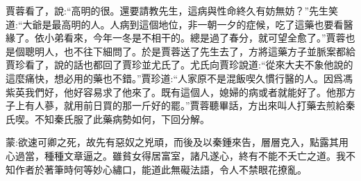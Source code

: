 \begin{parag}
    賈蓉看了，說:“高明的很。還要請教先生，這病與性命終久有妨無妨？”先生笑道:“大爺是最高明的人。人病到這個地位，非一朝一夕的症候，吃了這藥也要看醫緣了。依小弟看來，今年一冬是不相干的。總是過了春分，就可望全愈了。”賈蓉也是個聰明人，也不往下細問了。於是賈蓉送了先生去了，方將這藥方子並脈案都給賈珍看了，說的話也都回了賈珍並尤氏了。尤氏向賈珍說道:“從來大夫不象他說的這麼痛快，想必用的藥也不錯。”賈珍道:“人家原不是混飯喫久慣行醫的人。因爲馮紫英我們好，他好容易求了他來了。既有這個人，媳婦的病或者就能好了。他那方子上有人蔘，就用前日買的那一斤好的罷。”賈蓉聽畢話，方出來叫人打藥去煎給秦氏喫。不知秦氏服了此藥病勢如何，下回分解。
\end{parag}


\begin{parag}
    \begin{note}蒙:欲速可卿之死，故先有惡奴之兇頑，而後及以秦鍾來告，層層克入，點露其用心過當，種種文章逼之。雖貧女得居富室，諸凡遂心，終有不能不夭亡之道。我不知作者於著筆時何等妙心繡口，能道此無礙法語，令人不禁眼花撩亂。\end{note}
\end{parag}
